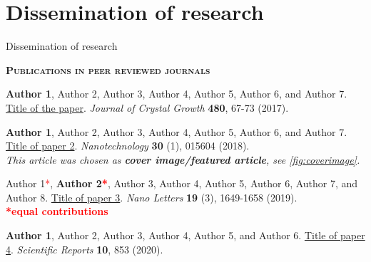 
\chapter{Dissemination of research}

\setcounter{figure}{0}
\renewcommand{\thefigure}{D.\arabic{figure}}

\updatemylofdissemination

%
{Dissemination of research}

\regularsection
\headerregularsection



{\color{sophia} \small \bfseries {} \selectfont \scshape Publications in peer reviewed journals}

\begin{enumerate}[wide=0em, leftmargin=*, labelsep=0.5em, widest=99, label={[\arabic*]}]

    \item \textbf{Author 1}, Author 2, Author 3, Author 4, Author 5, Author 6, and Author 7. \href{https://doi.org/10.1016/}{Title of the paper}. \textit{Journal of Crystal Growth} \textbf{480}, 67-73 (2017).
    
    \item \textbf{Author 1}, Author 2, Author 3, Author 4, Author 5, Author 6, and Author 7. \href{https://doi.org/10.1088/}{Title of paper 2}. \textit{Nanotechnology} \textbf{30} (1), 015604 (2018). \\
    \textit{This article was chosen as \textbf{cover image/featured article}, see \ref{fig:coverimage}.}
    
    \item Author 1\textcolor{red}{*}, \textbf{{Author 2}\textcolor{red}{*}}, Author 3, Author 4, Author 5, Author 6, Author 7, and Author 8. \href{https://doi.org/10.1021/}{Title of paper 3}. \textit{Nano Letters} \textbf{19} (3), 1649-1658 (2019). \\ \textcolor{red}{\textbf{*equal contributions}}
    
    \item \textbf{Author 1}, Author 2, Author 3, Author 4, Author 5, and Author 6. \href{https://doi.org/10.1038/}{Title of paper 4}. \textit{Scientific Reports} \textbf{10}, 853 (2020).
    
\end{enumerate}
 
